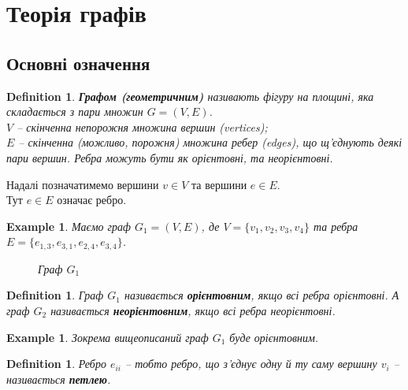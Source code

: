 \documentclass[a4paper, 14pt]{extarticle}
\theoremstyle{theoremdd}
\theoremstyle{theoremdd}
\newtheorem{definition}[theorem]{Definition}
\theoremstyle{theoremdd}
\theoremstyle{theoremdd}
\theoremstyle{theoremdd}
\newtheorem{example}[theorem]{Example}
\theoremstyle{theoremdd}
\theoremstyle{theoremdd}
\theoremstyle{theoremdd}
\theoremstyle{theoremdd}
\theoremstyle{theoremdd}
\theoremstyle{theoremdd}
\theoremstyle{theoremdd}
\theoremstyle{theoremdd}
\theoremstyle{theoremdd}
\theoremstyle{theoremdd}
\begin{document}
\section{Теорія графів}
\subsection{Основні означення}
\begin{definition}
\textbf{Графом (геометричним)} називають фігуру на площині, яка складається з пари множин $G = (V,E)$.\\
$V$ -- скінченна непорожня множина вершин (vertices);\\
$E$ -- скінченна (можливо, порожня) множина ребер (edges), що щ'єднують деякі пари вершин. Ребра можуть бути як орієнтовні, та неорієнтовні.
\end{definition}

Надалі позначатимемо вершини $v \in V$ та вершини $e \in E$.\\
Тут $e \in E$ означає ребро.

\begin{example}
Маємо граф $G_1 = (V,E)$, де $V = \{v_1,v_2,v_3,v_4\}$ та ребра $E = \{e_{1,3}, e_{3,1}, e_{2,4},e_{3,4}\}$.
\begin{figure}[H]
\centering
{}
\caption*{Граф $G_1$}
\end{figure}
\end{example}

\begin{definition}
Граф $G_1$ називається \textbf{орієнтовним}, якщо всі ребра орієнтовні. А граф $G_2$ називається \textbf{неорієнтовним}, якщо всі ребра неорієнтовні.
\end{definition}

\begin{example}
Зокрема вищеописаний граф $G_1$ буде орієнтовним.
\end{example}

\begin{definition}
Ребро $e_{ii}$ -- тобто ребро, що з'єднує одну й ту саму вершину $v_i$ -- називається \textbf{петлею}.
\end{definition}
\end{document}
